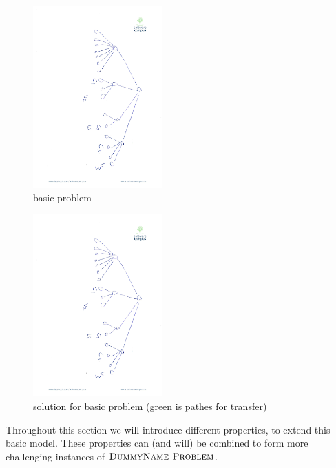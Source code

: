 \documentclass[9pt,twocolumn]{scrartcl}
\newcommand{\Problem}{\textsc{DummyName Problem}}
\begin{document}
\begin{figure}

\includegraphics[angle=90,origin=c, height=7cm]{figs/model_fig_skteches/basic_problem}
\caption{basic problem}
\label{fig:basic_problem}
\end{figure}
\begin{figure}

\includegraphics[angle=90,origin=c, height=7cm]{figs/model_fig_skteches/basic_problem}
\caption{solution for basic problem (green is pathes for transfer)}
\end{figure}

Throughout this section we will introduce different properties, to extend this
basic model. These properties can (and will) be combined to form more
challenging instances of $\Problem$.
\end{document}
